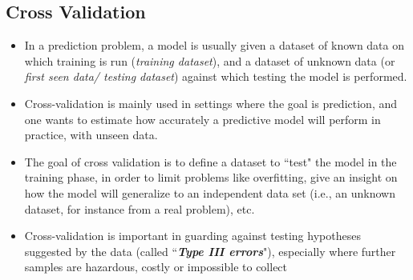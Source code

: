 \documentclass[a4paper,12pt]{article}
\begin{document}
\subsection{Cross Validation}
\begin{itemize}
\item In a prediction problem, a model is usually given a dataset of known data 
on which training is run (\textit{training dataset}), and a dataset of unknown data (or \textit{first seen data/ testing dataset}) against which testing the model is performed.
\item Cross-validation is mainly used in settings where the goal is prediction, and one wants to estimate how accurately a predictive model will perform in practice, with unseen data.
\item The goal of cross validation is to define a dataset to ``test" the model in the training phase, in order to limit problems like overfitting, give an insight on how the model will generalize to an independent data set (i.e., an unknown dataset, for instance from a real problem), etc.
\item Cross-validation is important in guarding against testing hypotheses suggested by the data (called ``\textbf{\textit{Type III errors}}"), especially where further samples 
are hazardous, costly or impossible to collect 
\end{itemize}
\end{document}
